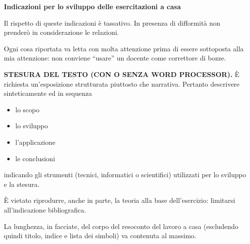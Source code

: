 \begin{center}
\bfseries \normalsize Indicazioni per lo sviluppo delle esercitazioni a casa
\end{center}

Il rispetto di queste indicazioni è tassativo. In presenza di difformità non prenderò in considerazione le relazioni.

Ogni cosa riportata va letta con molta attenzione prima di essere sottoposta alla mia attenzione: non conviene ``usare'' un docente come correttore di bozze.

\textbf{STESURA DEL TESTO (CON O SENZA WORD PROCESSOR).} È richiesta un'esposizione strutturata piuttosto che narrativa.
Pertanto descrivere sinteticamente ed in sequenza \\[-1.6em]
\begin{itemize}
\setlength\itemsep{0em}
\item lo scopo
\item lo sviluppo
\item l'applicazione
\item le conclusioni
\end{itemize}
indicando gli strumenti (tecnici, informatici o scientifici) utilizzati per lo sviluppo e la stesura.

È vietato riprodurre, anche in parte, la teoria alla base dell'esercizio: limitarsi all'indicazione bibliografica.

La lunghezza, in facciate, del corpo del resoconto del lavoro a casa (escludendo quindi titolo, indice e lista dei simboli) va
contenuta al massimo.

